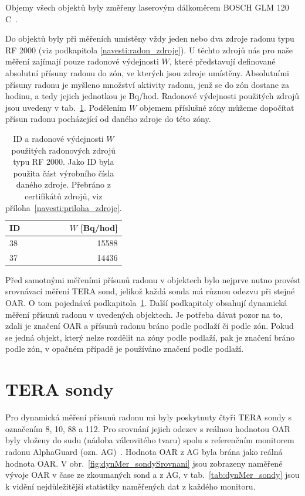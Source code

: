 Objemy všech objektů byly změřeny laserovým dálkoměrem BOSCH GLM 120 C~\cite{dalkomer}.

Do objektů byly při měřeních umístěny vždy jeden nebo dva zdroje radonu typu RF 2000 (viz podkapitola \ref{navesti:radon_zdroje}). U těchto zdrojů nás pro naše měření zajímají pouze radonové výdejnosti $W$, které představují definované absolutní přísuny radonu do zón, ve kterých jsou zdroje umístěny. Absolutními přísuny radonu je myšleno množství aktivity radonu, jenž se do zón dostane za hodinu, a tedy jejich jednotkou je \si{Bq/hod}. Radonové výdejnosti použitých zdrojů jsou uvedeny v tab.~\ref{tab:dynMer_zdroje}. Podělením $W$ objemem příslušné zóny můžeme dopočítat přísun radonu pocházející od daného zdroje do této zóny. 
\begin{table}[ht]
    \centering
    \caption{ID a radonové výdejnosti $W$ použitých radonových zdrojů typu RF 2000. Jako ID byla použita část výrobního čísla daného zdroje. Přebráno z certifikátů zdrojů, viz příloha~\ref{navesti:priloha_zdroje}.}
    \label{tab:dynMer_zdroje}
    \begin{tabular}{lr}
        \toprule
        ID & $W$ [\si{Bq/hod}]\\
        \midrule
        38 & 15588\\
        37 & 14436\\
        \bottomrule
    \end{tabular}
\end{table}

Před samotnými měřeními přísunů radonu v objektech bylo nejprve nutno provést srovnávací měření TERA sond, jelikož každá sonda má různou odezvu při stejné OAR. O tom pojednává podkapitola~\ref{navesti:dynMer_TERA}. Další podkapitoly obsahují dynamická měření přísunů radonu v uvedených objektech. Je potřeba dávat pozor na to, zdali je značení OAR a přísunů radonu bráno podle podlaží či podle zón. Pokud se jedná objekt, který nelze rozdělit na zóny podle podlaží, pak je značení bráno podle zón, v opačném případě je používáno značení podle podlaží.

\section{TERA sondy}\label{navesti:dynMer_TERA}

Pro dynamická měření přísunů radonu mi byly poskytnuty čtyři TERA sondy s označením 8, 10, 88 a 112. Pro srovnání jejich odezev s reálnou hodnotou OAR byly vloženy do sudu (nádoba válcovitého tvaru) spolu s referenčním monitorem radonu AlphaGuard (ozn. AG)~\cite{alphaguard}. Hodnota OAR z AG byla brána jako reálná hodnota OAR. V obr.~\ref{fig:dynMer_sondySrovnani} jsou zobrazeny naměřené vývoje OAR v čase ze zkoumaných sond a z AG, v tab.~\ref{tab:dynMer_sondy} jsou k vidění nejdůležitější statistiky naměřených dat z každého monitoru.

